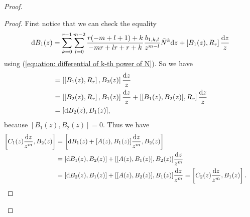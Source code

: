 \documentclass[pdftex]{sigma}
\numberwithin{equation}{section}
\begin{document}
\begin{proof}
\begin{proof}
First notice that we can check the equality
\[
 {\rm d}B_1(z)
 =
 \sum_{k=0}^{r-1}\sum_{l=0}^{m-2}
 \frac { r(-m+l+1)+k} {-mr+lr+r+k}
 \frac {b_{1,k,l}} {z^{m-l}} \tilde{N}^k {\rm d}z
 +\left[B_1(z),R_r \right]\frac{{\rm d}z} {z}
\]
using (\ref{equation: differential of k-th power of N}).
So we have
\begin{align*}
 [{\rm d}B_1(z),B_2(z)]
 &=
 \left[\left[B_1(z),R_r\right],B_2(z)\right]\frac{{\rm d}z} {z}
 \\
 &=
 \left[
 \left[B_2(z),R_r \right], B_1(z)\right] \frac{{\rm d}z} {z}
 +\left[ [B_1(z),B_2(z) ] , R_r \right]\frac{{\rm d}z}{z}
 \\
 &=[{\rm d}B_2(z),B_1(z)],
\end{align*}
because
$[B_1(z),B_2(z)]=0$.
Thus we have
\begin{align*}
 \left[C_1(z)\frac{{\rm d}z}{z^m} , B_2(z) \right]
 &=
 \left[ {\rm d}B_1(z)+[A(z),B_1(z)]\frac{{\rm d}z}{z^m} , B_2(z)\right]
 \\
 &=
 [{\rm d}B_1(z),B_2(z)]+[[A(z),B_1(z)],B_2(z)]\frac{{\rm d}z}{z^m}
 \\
 &=
 [{\rm d}B_2(z),B_1(z)]+[[A(z),B_2(z)],B_1(z)]\frac{{\rm d}z}{z^m}
 =\left[C_2(z)\frac{{\rm d}z}{z^m},B_1(z)\right].\!\!\!\tag*{\qed}
\end{align*}\renewcommand{\qed}{}
\end{proof}


\end{proof}
\end{document}
